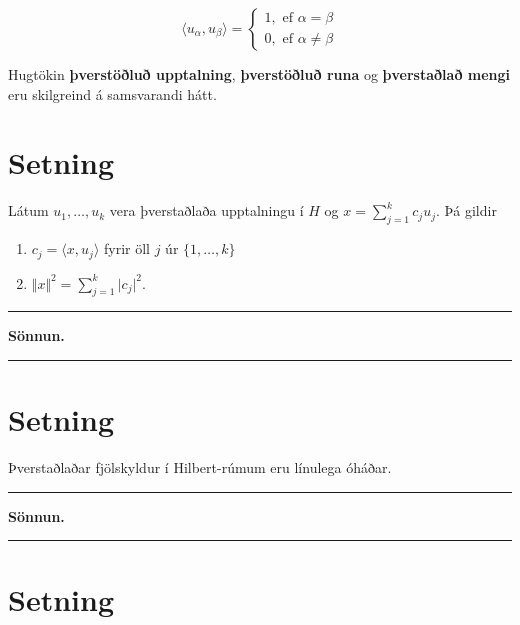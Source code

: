 \documentclass[]{book}
\begin{document}
\[
\langle u_\alpha, u_\beta\rangle = 
\begin{cases}
1, \text{ ef } \alpha = \beta \\
0, \text{ ef } \alpha \neq \beta
\end{cases}
\]

Hugtökin \textbf{þverstöðluð upptalning}, \textbf{þverstöðluð runa} og \textbf{þverstaðlað mengi} eru skilgreind á samsvarandi hátt.

\hypertarget{setning-82}{%
\section*{Setning}\label{setning-82}}

Látum \(u_1, \dots, u_k\) vera þverstaðlaða upptalningu í \(H\) og \(x = \sum_{j=1}^k c_ju_j\). Þá gildir

\begin{enumerate}
\def\labelenumi{\arabic{enumi}.}
\item
  \(c_j = \langle x,u_j\rangle\) fyrir öll \(j\) úr \(\{1, \dots, k\}\)
\item
  \(\Vert x\Vert^2 = \sum_{j=1}^k\vert c_j\vert^2\).
\end{enumerate}

\begin{center}\rule{0.5\linewidth}{\linethickness}\end{center}

\textbf{Sönnun.}

\begin{center}\rule{0.5\linewidth}{\linethickness}\end{center}

\hypertarget{setning-83}{%
\section*{Setning}\label{setning-83}}

Þverstaðlaðar fjölskyldur í Hilbert-rúmum eru línulega óháðar.

\begin{center}\rule{0.5\linewidth}{\linethickness}\end{center}

\textbf{Sönnun.}

\begin{center}\rule{0.5\linewidth}{\linethickness}\end{center}

\hypertarget{setning-84}{%
\section*{Setning}\label{setning-84}}
\end{document}
